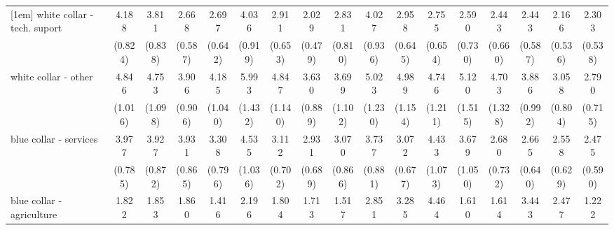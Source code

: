 {\begin{tabular}{l*{16}{c}}
[1em]
white collar - tech. suport&       4.188\sym{***}&       3.811\sym{***}&       2.668\sym{***}&       2.697\sym{***}&       4.036\sym{***}&       2.911\sym{***}&       2.029\sym{**} &       2.831\sym{***}&       4.027\sym{***}&       2.958\sym{***}&       2.755\sym{***}&       2.590\sym{***}&       2.443\sym{***}&       2.443\sym{***}&       2.166\sym{**} &       2.303\sym{***}\\
                    &     (0.824)         &     (0.838)         &     (0.587)         &     (0.642)         &     (0.919)         &     (0.653)         &     (0.479)         &     (0.810)         &     (0.936)         &     (0.645)         &     (0.654)         &     (0.730)         &     (0.660)         &     (0.587)         &     (0.536)         &     (0.538)         \\
[1em]
white collar - other&       4.846\sym{***}&       4.753\sym{***}&       3.906\sym{***}&       4.185\sym{***}&       5.993\sym{***}&       4.847\sym{***}&       3.630\sym{***}&       3.699\sym{***}&       5.023\sym{***}&       4.989\sym{***}&       4.746\sym{***}&       5.120\sym{***}&       4.703\sym{***}&       3.886\sym{***}&       3.058\sym{***}&       2.790\sym{***}\\
                    &     (1.016)         &     (1.098)         &     (0.906)         &     (1.040)         &     (1.432)         &     (1.140)         &     (0.889)         &     (1.102)         &     (1.230)         &     (1.154)         &     (1.211)         &     (1.515)         &     (1.328)         &     (0.992)         &     (0.804)         &     (0.715)         \\
[1em]
blue collar - services&       3.977\sym{***}&       3.927\sym{***}&       3.931\sym{***}&       3.308\sym{***}&       4.535\sym{***}&       3.112\sym{***}&       2.931\sym{***}&       3.070\sym{***}&       3.737\sym{***}&       3.072\sym{***}&       4.433\sym{***}&       3.679\sym{***}&       2.680\sym{***}&       2.665\sym{***}&       2.558\sym{***}&       2.475\sym{***}\\
                    &     (0.785)         &     (0.872)         &     (0.865)         &     (0.796)         &     (1.036)         &     (0.702)         &     (0.689)         &     (0.866)         &     (0.881)         &     (0.677)         &     (1.073)         &     (1.050)         &     (0.732)         &     (0.640)         &     (0.629)         &     (0.590)         \\
[1em]
blue collar - agriculture&       1.822\sym{*}  &       1.853\sym{*}  &       1.860\sym{*}  &       1.416         &       2.196\sym{**} &       1.804\sym{*}  &       1.713         &       1.517         &       2.851\sym{***}&       3.285\sym{**} &       4.464\sym{***}&       1.610         &       1.614         &       3.443\sym{***}&       2.477\sym{**} &       1.222         \\

\end{tabular}}
